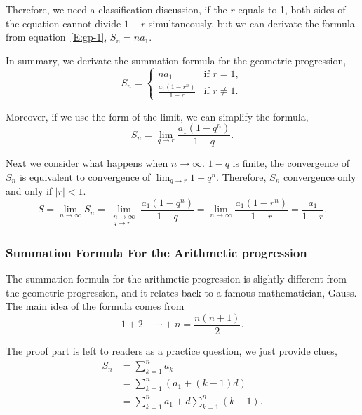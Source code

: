 Therefore, we need a classification discussion, if the $r$ equals to 1, both sides of the equation cannot divide $1-r$ simultaneously, but we can derivate the formula from equation~\eqref{E:gp-1}, $S_n=na_1$.

In summary, we derivate the summation formula for the geometric progression,
\begin{equation}\label{E:gp-4}
    S_n = \begin{cases}
              na_1 & \text{if } r=1, \\
              \frac{a_1(1-r^n)}{1-r} & \text{if } r\neq 1.
          \end{cases}
\end{equation}

Moreover, if we use the form of the limit, we can simplify the formula,
\begin{equation}\label{E:gp-5}
    S_n = \lim_{q\to r} \frac{a_1(1-q^n)}{1-q}.
\end{equation}

Next we consider what happens when $n\to\infty$. $1-q$ is finite, the convergence of $S_n$ is equivalent to convergence of $\lim_{q\to r}1-q^n$. Therefore,  $S_n$ convergence only and only if $|r|<1$.
\begin{equation}\label{E:gp-6}
    S = \lim_{n\to\infty} S_n = \lim_{\substack{n\to\infty \\ q\to r}} \frac{a_1(1-q^n)}{1-q} = \lim_{n\to\infty}\frac{a_1(1-r^n)}{1-r} = \frac{a_1}{1-r}.
\end{equation}

\subsubsection{Summation Formula For the Arithmetic progression}
The summation formula for the arithmetic progression is slightly different from the geometric progression, and it relates back to a famous mathematician, Gauss. The main idea of the formula comes from
\[
    1+2+\cdots+n = \frac{n(n+1)}{2}.
\]

The proof part is left to readers as a practice question, we just provide clues,
\begin{equation}\label{E:ap-1}
    \begin{aligned}
        S_n &= \sum_{k=1}^n a_k \\
            &= \sum_{k=1}^n (a_1+(k-1)d) \\
            &= \sum_{k=1}^n a_1 + d\sum_{k=1}^n (k-1).
    \end{aligned}
\end{equation}
